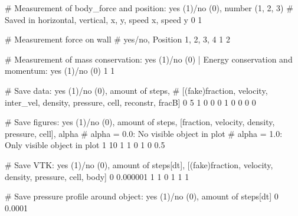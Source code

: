 # Measurement of body_force and position: yes (1)/no (0), number (1, 2, 3)
# Saved in horizontal, vertical, x, y, speed x, speed y
0 1

# Measurement force on wall
# yes/no, Position 1, 2, 3, 4
1 2

# Measurement of mass conservation: yes (1)/no (0) | Energy conservation and momentum: yes (1)/no (0)
1 1

# Save data: yes (1)/no (0), amount of steps,
# [(fake)fraction, velocity, inter_vel, density, pressure, cell, reconstr, fracB]
0	5	1 0 0 0 1 0 0 0 0

# Save figures: yes (1)/no (0), amount of steps, [fraction, velocity, density, pressure, cell], alpha
# alpha = 0.0: No visible object in plot
# alpha = 1.0: Only visible object in plot
1 	10	1 1 0 1 0	0.5

# Save VTK: yes (1)/no (0), amount of steps[dt], [(fake)fraction, velocity, density, pressure, cell, body]
0 	0.000001	1 1 0 1 1 1

# Save pressure profile around object: yes (1)/no (0), amount of steps[dt]
0  0.0001

